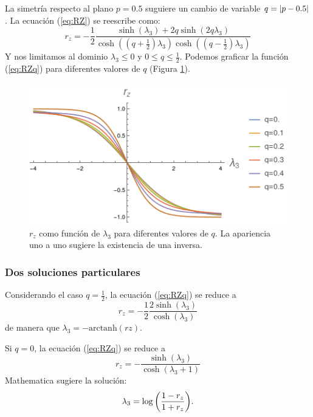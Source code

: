 La simetría respecto al plano $p=0.5$ suguiere un cambio de variable $q=\abs{p-0.5}$. La ecuación (\ref{eq:RZ}) se reescribe como:
\begin{equation}\label{eq:RZq}
r_{z}=-\frac{1}{2}\frac{\sinh(\lambda_{3})+2q\sinh(2q\lambda_{3})}{\cosh((q+\frac{1}{2})\lambda_{3})\cosh((q-\frac{1}{2})\lambda_{3})}
\end{equation}
Y nos limitamos al dominio $\lambda_{3}\leq0$ y $0\leq q\leq\frac{1}{2}$. Podemos graficar la función (\ref{eq:RZq}) para diferentes valores de $q$ (Figura \ref{fig:rzinv}).
\begin{figure}[h!]
\centering
\includegraphics[width=0.6\linewidth]{maxent/figures/rz_has_inverse_lambda-4to4.png}
\caption{$r_{z}$ como función de $\lambda_{3}$ para diferentes valores de $q$. La apariencia uno a uno sugiere la existencia de una inversa.}
\label{fig:rzinv}
\end{figure}

\subsubsection{Dos soluciones particulares}

Considerando el caso $q=\frac{1}{2}$, la ecuación (\ref{eq:RZq}) se reduce a 
\begin{equation}
r_z=-\frac{1}{2}\frac{2\sinh(\lambda_{3})}{\cosh(\lambda_{3})}
\end{equation}
de manera que $\lambda_{3}=-\text{arctanh}(rz)$.

Si $q=0$, la ecuación (\ref{eq:RZq}) se reduce a
\begin{equation}
r_z=-\frac{\sinh(\lambda_{3})}{\cosh(\lambda_{3}+1)}
\end{equation}
Mathematica sugiere la solución:
\begin{equation}\label{eq:lambda0.5}
\lambda_{3}=\log\qty(\frac{1-r_{z}}{1+r_{z}}).
\end{equation}
